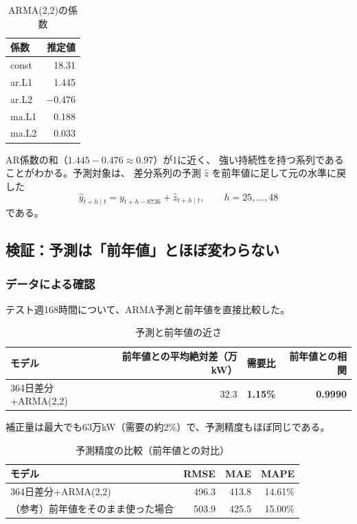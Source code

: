 \documentclass[a4paper,11pt]{ltjsarticle}
\begin{document}
\begin{table}[htbp]
  \centering
  \caption{ARMA(2,2)の係数}
  \label{tab:arma-coef}
  \begin{tabular}{lr}
    \toprule
    係数 & 推定値 \\
    \midrule
    const & 18.31 \\
    ar.L1 & 1.445 \\
    ar.L2 & $-0.476$ \\
    ma.L1 & 0.188 \\
    ma.L2 & 0.033 \\
    \bottomrule
  \end{tabular}
\end{table}

AR係数の和（$1.445-0.476 \approx 0.97$）が1に近く、
強い持続性を持つ系列であることがわかる。予測対象は、
差分系列の予測 $\hat{z}$ を前年値に足して元の水準に戻した
\begin{equation*}
  \hat{y}_{t+h\mid t} = y_{t+h-8736} + \hat{z}_{t+h\mid t}, \qquad h = 25, \dots, 48
\end{equation*}
である。

\subsection{検証：予測は「前年値」とほぼ変わらない}
\label{sec:verify}

\subsubsection{データによる確認}

テスト週168時間について、ARMA予測と前年値を直接比較した。

\begin{table}[htbp]
  \centering
  \caption{予測と前年値の近さ}
  \begin{tabular}{lrrr}
    \toprule
    モデル & 前年値との平均絶対差（万kW） & 需要比 & 前年値との相関 \\
    \midrule
    364日差分+ARMA(2,2) & 32.3 & \textbf{1.15\%} & \textbf{0.9990} \\
    \bottomrule
  \end{tabular}
\end{table}

補正量は最大でも63万kW（需要の約2\%）で、予測精度もほぼ同じである。

\begin{table}[htbp]
  \centering
  \caption{予測精度の比較（前年値との対比）}
  \begin{tabular}{lrrr}
    \toprule
    モデル & RMSE & MAE & MAPE \\
    \midrule
    364日差分+ARMA(2,2) & 496.3 & 413.8 & 14.61\% \\
    （参考）前年値をそのまま使った場合 & 503.9 & 425.5 & 15.00\% \\
    \bottomrule
  \end{tabular}
\end{table}
\end{document}
